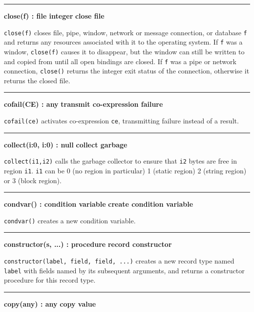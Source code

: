 \bigskip
\hrule\vspace{0.1cm}
\noindent
{\bf close(f) : file {\textbar} integer } \hfill {\bf close file}

\noindent
{}\texttt{close(f)} closes file, pipe,
window, network or message connection, or database \texttt{f}
and returns any resources associated with it to the operating system.
If \texttt{f} was a window, \texttt{close(f)} causes it to disappear,
but the window can still be written to and copied from until all open
bindings are closed. If \texttt{f} was a pipe or network connection,
\texttt{close()} returns the integer exit
status of the connection, otherwise it returns the closed file.

\bigskip
\hrule\vspace{0.1cm}
\noindent
{\bf cofail(CE) : any } \hfill {\bf transmit co-expression failure}

\noindent
{}\texttt{cofail(ce)} activates
co-expression \texttt{ce}, transmitting failure instead of a result.

\bigskip
\hrule\vspace{0.1cm}
\noindent
{\bf collect(i:0, i:0) : null } \hfill {\bf collect garbage}

\noindent
{}\texttt{collect(i1,i2)} calls the
garbage collector to ensure that \texttt{i2} bytes
are free in region \texttt{i1}. \texttt{i1} can be 0 (no region in particular)
1 (static region) 2 (string region) or 3 (block region).

\bigskip
\hrule\vspace{0.1cm}
\noindent
{\bf condvar() : condition variable } \hfill {\bf create condition variable}

\noindent
{}\texttt{condvar()} creates
a new condition variable.

\bigskip
\hrule\vspace{0.1cm}
\noindent
{\bf constructor(s, ...) : procedure } \hfill {\bf record constructor}

\noindent
{}\texttt{constructor(label, field, field, ...)}
creates a new record type named \texttt{label} with fields named by its
subsequent arguments, and returns a constructor procedure for this
record type.

\bigskip
\hrule\vspace{0.1cm}
\noindent
{\bf copy(any) : any } \hfill {\bf copy value}\WarningNotThreadSafe

